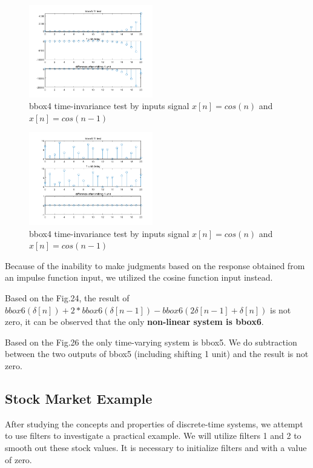 \documentclass[journal]{IEEEtran}
\begin{document}
\begin{figure}[H]
   \centering
   \includegraphics[width=0.48\textwidth]{2.7.5.png} %
   \caption{bbox4 time-invariance test by inputs signal $x[n]=cos(n)$ and $x[n]=cos(n-1)$}
   \label{fig:2.7.5}
\end{figure}

\begin{figure}[H]
   \centering
   \includegraphics[width=0.48\textwidth]{2.7.6.png} %
   \caption{bbox4 time-invariance test by inputs signal $x[n]=cos(n)$ and $x[n]=cos(n-1)$}
   \label{fig:2.7.6}
\end{figure}

Because of the inability to make judgments based on the response obtained from an impulse function input, 
we utilized the cosine function input instead. 

Based on the Fig.24, the result of $bbox6(\delta[n])+2*bbox6(\delta[n-1])-bbox6(2\delta[n-1]+\delta[n])$ is not zero, 
it can be observed that the only \textbf{non-linear system is bbox6}.

Based on the Fig.26 the only time-varying system is bbox5. We do subtraction between the two outputs of bbox5 (including shifting 1 unit) and the result is not zero.

\subsection{Stock Market Example}
After studying the concepts and properties of discrete-time systems, we attempt to use filters to investigate a practical example.
We will utilize filters 1 and 2 to smooth out these stock values. 
It is necessary to initialize filters  and  with a value of zero.
\end{document}
